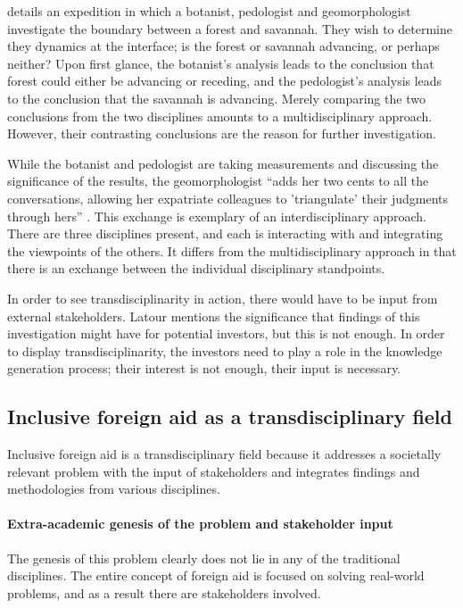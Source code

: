 \documentclass[a4paper]{article}
\begin{document}
\cite{latour1999circulating} details an expedition in which a botanist,
pedologist and geomorphologist investigate the boundary between a forest and
savannah. They wish to determine they dynamics at the interface; is the forest
or savannah advancing, or perhaps neither? Upon first glance, the botanist's
analysis leads to the conclusion that forest could either be advancing or
receding, and the pedologist's analysis leads to the conclusion that the
savannah is advancing.  Merely comparing the two conclusions from the two
disciplines amounts to a multidisciplinary approach. However, their
contrasting conclusions are the reason for further investigation.

While the botanist and pedologist are taking measurements and discussing the
significance of the results, the geomorphologist ``adds her two cents to all
the conversations, allowing her expatriate colleagues to 'triangulate' their
judgments through hers'' \citep{latour1999circulating}. This exchange is
exemplary of an interdisciplinary approach. There are three disciplines
present, and each is interacting with and integrating the viewpoints of the
others. It differs from the multidisciplinary approach in that there is an
exchange between the individual disciplinary standpoints.

In order to see transdisciplinarity in action, there would have to be input
from external stakeholders. Latour mentions the significance that findings of
this investigation might have for potential investors, but this is not enough.
In order to display transdisciplinarity, the investors need to play a role in
the knowledge generation process; their interest is not enough, their input is
necessary.

\subsection{Inclusive foreign aid as a transdisciplinary field}

Inclusive foreign aid is a transdisciplinary field because it addresses a
societally relevant problem with the input of stakeholders and integrates
findings and methodologies from various disciplines.

\paragraph{Extra-academic genesis of the problem and stakeholder input}

The genesis of this problem clearly does not lie in any of the traditional
disciplines. The entire concept of foreign aid is focused on solving
real-world problems, and as a result there are stakeholders involved.
\end{document}
